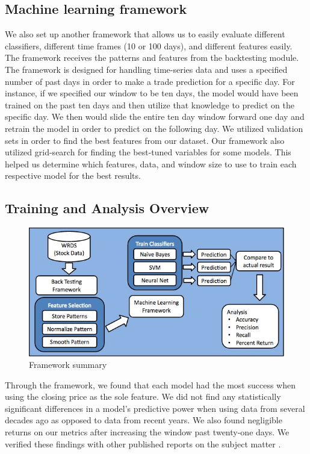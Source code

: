 \documentclass{article}
\begin{document}
\subsection{Machine learning framework}
We also set up another framework that allows us to easily evaluate different classifiers, different time frames (10 or 100 days), and different features easily. The framework receives the patterns and features from the backtesting module. The framework is designed for handling time-series data and uses a specified number of past days in order to make a trade prediction for a specific day. For instance, if we specified our window to be ten days, the model would have been trained on the past ten days and then utilize that knowledge to predict on the specific day. We then would slide the entire ten day window forward one day and retrain the model in order to predict on the following day. We utilized validation sets in order to find the best features from our dataset. Our framework also utilized grid-search for finding the best-tuned variables for some models. This helped us determine which features, data, and window size to use to train each respective model for the best results.

\subsection{Training and Analysis Overview}
\begin{figure}[h!]
\begin{center}
        \includegraphics[scale=0.37]{summary_fig}
        \caption{Framework summary}
\end{center}
\end{figure}

Through the framework, we found that each model had the most success when using the closing price as the sole feature. We did not find any statistically significant differences in a model's predictive power when using data from several decades ago as opposed to data from recent years. We also found negligible returns on our metrics after increasing the window past twenty-one days. We verified these findings with other published reports on the subject matter \cite{lin}.
\end{document}
